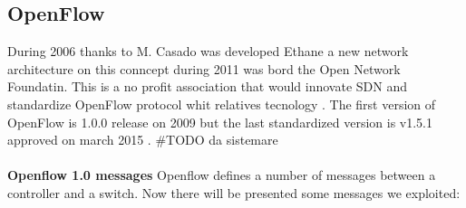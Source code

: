 \documentclass[conference,10pt]{IEEEtran}
\begin{document}
  \subsection{OpenFlow}
  During 2006 thanks to M. Casado was developed Ethane a new network architecture on this conncept during 2011 was bord the Open Network Foundatin.
  This is a no profit association that would innovate SDN and standardize OpenFlow protocol whit relatives tecnology \cite{ONF}.
  The first version of OpenFlow is 1.0.0 release on 2009 but the last standardized version is v1.5.1 approved on march 2015 \cite{ONF_report}.
  \#TODO da sistemare
  \\
  \\
  \textbf{Openflow 1.0 messages}
Openflow defines a number of messages between a controller and a switch. Now there will be presented some messages we exploited:\cite{openflow}
\end{document}
